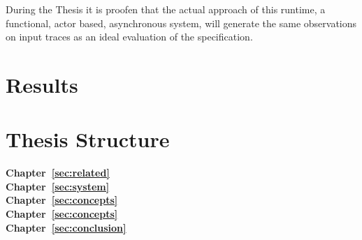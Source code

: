 During the Thesis it is proofen that the actual approach of this runtime, a functional, actor based, asynchronous system,
will generate the same observations on input traces as an ideal evaluation of the specification.

\section{Results}
\label{sec:intro:results}


\section{Thesis Structure}
\label{sec:intro:structure}

\textbf{Chapter~\ref{sec:related}} \\[0.2em]

\textbf{Chapter~\ref{sec:system}} \\[0.2em]

\textbf{Chapter~\ref{sec:concepts}} \\[0.2em]

\textbf{Chapter~\ref{sec:concepts}} \\[0.2em]

\textbf{Chapter~\ref{sec:conclusion}} \\[0.2em]
